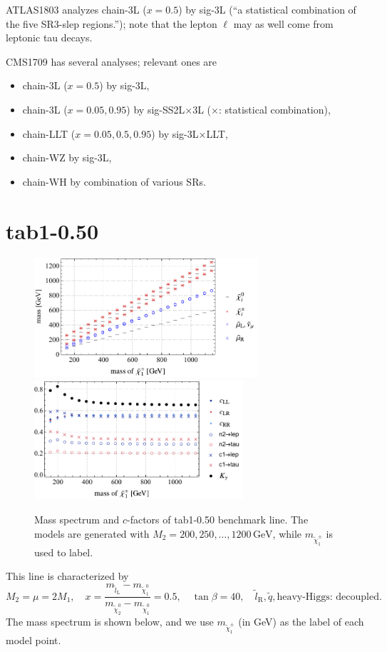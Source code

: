\documentclass[a4paper,10pt,captions=tableheading,DIV=14]{scrartcl}
\numberwithin{equation}{section}
\newcommand\w[1]{_{\mathrm{#1}}}
\newcommand\unit[1]{\,\mathrm{#1}\xspace}
\newcommand\GeV{\unit{GeV}}
\newcommand\neut  [1][\relax]{{\tilde\chi^0_{#1}}}
\newcommand\charPM[1][\relax]{{\tilde\chi^\pm_{#1}}}
\begin{document}
ATLAS1803 analyzes chain-3L ($x=0.5$) by sig-3L (``a statistical combination of the five SR3-slep regions.''); note that the lepton $\ell$ may as well come from leptonic tau decays.

CMS1709 has several analyses; relevant ones are
\begin{itemize}
 \item chain-3L ($x=0.5$) by  sig-3L,
 \item chain-3L ($x=0.05, 0.95$) by sig-SS2L$\times$3L ($\times$: statistical combination),
 \item chain-LLT ($x=0.05, 0.5, 0.95$) by sig-3L$\times$LLT,
 \item chain-WZ by sig-3L,
 \item chain-WH by combination of various SRs.
\end{itemize}


\section{tab1-0.50}

\begin{figure}[h]
  \centering
  \includegraphics[height=125pt]{../plots/plot_data_tab1_x050.pdf}
  \includegraphics[height=125pt]{../plots/plot_data_tab1_x050_cfactors.pdf}
  \caption{Mass spectrum and $c$-factors of tab1-0.50 benchmark line. The models are generated with $M_2=200,250,\dots,1200\GeV$, while $m_{\charPM[1]}$ is used to label.}
\end{figure}

This line is characterized by
\begin{equation}
 M_2=\mu=2M_1,
\quad
 x = \frac{m_{\tilde l\w L}-m_{\neut[1]}}{m_{\neut[2]}-m_{\neut[1]}}=0.5,
\quad
 \tan\beta=40,
\quad
 \tilde l\w R, \tilde q, \text{heavy-Higgs: decoupled}.
\end{equation}
The mass spectrum is shown below, and we use $m_{\charPM[1]}$ (in GeV) as the label of each model point.
\end{document}
